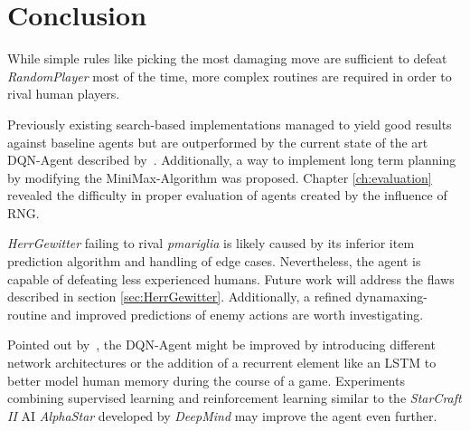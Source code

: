 
\chapter{Conclusion}
\label{ch:conclusion}

While simple rules like picking the most damaging move are sufficient to defeat 
\textit{RandomPlayer} most of the time, more complex routines are required 
in order to rival human players. 

Previously existing search-based implementations managed to yield good results against 
baseline agents but are outperformed by the current state of the art DQN-Agent 
described by~\cite{Huang_Lee_2019}. 
Additionally, a way to implement long term planning by modifying the MiniMax-Algorithm
was proposed. Chapter \ref{ch:evaluation} revealed the difficulty in proper evaluation
of agents created by the influence of \ac{RNG}. 

\textit{HerrGewitter} failing to rival \textit{pmariglia} is likely caused by its inferior
item prediction algorithm and handling of edge cases. Nevertheless, the agent is capable
of defeating less experienced humans. Future work will address the flaws described in
section \ref{sec:HerrGewitter}. Additionally, a refined dynamaxing-routine and improved
predictions of enemy actions are worth investigating.

Pointed out by~\cite{Huang_Lee_2019}, the DQN-Agent might be improved
by introducing \grqq different network architectures or the addition
of a recurrent element like an LSTM to better model human memory during the 
course of a game\grqq. Experiments combining supervised learning and
reinforcement learning similar to the \textit{StarCraft II} AI \textit{AlphaStar} 
developed by \textit{DeepMind} may improve the agent even further. 